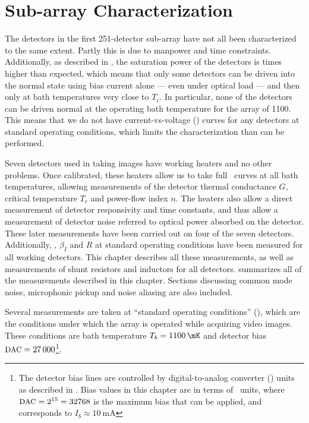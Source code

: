 \chapter{Sub-array Characterization}\label{c:det-array}

The detectors in the first 251-detector sub-array have not all been characterized to the same extent.
Partly this is due to manpower and time constraints.
Additionally, as described in , the saturation power of the detectors is  times higher than expected, which means that only some detectors can be driven into the normal state using bias current alone --- even under optical load --- and then only at bath temperatures very close to $T_c$.
In particular, none of the detectors can be driven normal at the operating bath temperature for the array of \SI{1100}{\mK}.
This means that we do not have current-vs-voltage (\IV) curves for any detectors at standard operating conditions, which limits the characterization than can be performed.

Seven detectors used in taking images have working heaters and no other problems.
Once calibrated, these heaters allow us to take full \IV\ curves at all bath temperatures, allowing measurements of the detector thermal conductance $G$, critical temperature $T_c$ and power-flow index $n$.
The heaters also allow a direct measurement of detector responsivity and time constants, and thus allow a measurement of detector noise referred to optical power absorbed on the detector.
These later measurements have been carried out on four of the seven detectors.
Additionally, \Loop, $\beta_I$ and $R$ at standard operating conditions have been measured for all working detectors.
This chapter describes all these measurements, as well as measurements of shunt resistors and inductors for all detectors.
 summarizes all of the measurements described in this chapter.
Sections discussing common mode noise, microphonic pickup and noise aliasing are also included.

Several measurements are taken at ``standard operating conditions'' (\SOC), which are the conditions under which the array is operated while acquiring video images.
These conditions are bath temperature $T_b = \SI{1100}{\mK}$ and detector bias $\mbox{{\small DAC}} = \num{27000}$\footnote{The detector bias lines are controlled by digital-to-analog converter (\DAC) units as described in . Bias values in this chapter are in terms of \DAC\ units, where $\mbox{{\small DAC}} = 2^{15} = 32768$ is the maximum bias that can be applied, and corresponds to $I_b \approx \SI{10}{\mA}$}.

